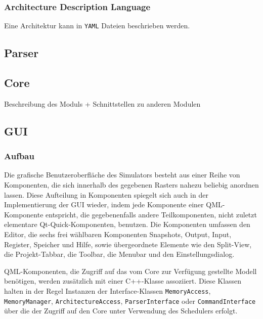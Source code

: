 \subsubsection{Architecture Description Language}

Eine Architektur kann in \texttt{YAML} Dateien beschrieben werden.




\subsection{Parser}

\subsection{Core}

Beschreibung des Moduls + Schnittstellen zu anderen Modulen

\subsection{GUI}


\subsubsection{Aufbau}

Die grafische Benutzeroberfläche des Simulators besteht aus einer Reihe von Komponenten, die sich innerhalb des gegebenen Rasters nahezu beliebig anordnen lassen. Diese Aufteilung in Komponenten spiegelt sich auch in der Implementierung der GUI wieder, indem jede Komponente einer QML-Komponente entspricht, die gegebenenfalls andere Teilkomponenten, nicht zuletzt elementare Qt-Quick-Komponenten, benutzen. Die Komponenten umfassen den Editor, die sechs frei wählbaren Komponenten Snapshots, Output, Input, Register, Speicher und Hilfe, sowie übergeordnete Elemente wie den Split-View, die Projekt-Tabbar, die Toolbar, die Menubar und den Einstellungsdialog.

QML-Komponenten, die Zugriff auf das vom Core zur Verfügung gestellte Modell benötigen, werden zusätzlich mit einer C++-Klasse assoziiert. Diese Klassen halten in der Regel Instanzen der Interface-Klassen \texttt{MemoryAccess}, \texttt{MemoryManager}, \texttt{ArchitectureAccess}, \texttt{ParserInterface} oder \texttt{CommandInterface}  über die der Zugriff auf den Core unter Verwendung des Schedulers erfolgt.

